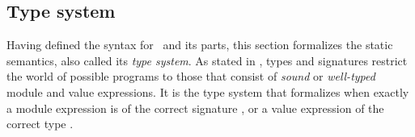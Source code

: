 




\subsection{Type system}
\label{sec:MLTypeSystem}
Having defined the syntax for \MiniML\ and its parts, this section formalizes the static semantics, also called its \emph{type system}.
As stated in , types and signatures restrict the world of possible programs to those that consist of \emph{sound} or \emph{well-typed} module and value expressions.
It is the type system that formalizes when exactly a module expression  is of the correct signature , or a value expression  of the correct type \cmath{\tau}.

